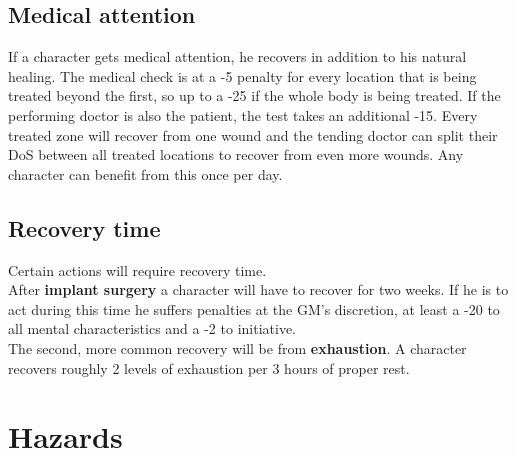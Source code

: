 \documentclass[12pt,a4paper]{book}
\begin{document}
	\section{Medical attention}
	If a character gets medical attention, he recovers in addition to his natural healing. The medical check is at a -5 penalty for every location that is being treated beyond the first, so up to a -25 if the whole body is being treated. If the performing doctor is also the patient, the test takes an additional -15. Every treated zone will recover from one wound and the tending doctor can split their DoS between all treated locations to recover from even more wounds. Any character can benefit from this once per day.
	\section{Recovery time}
	Certain actions will require recovery time.\\
	After \textbf{implant surgery} a character will have to recover for two weeks. If he is to act during this time he suffers penalties at the GM’s discretion, at least a -20 to all mental characteristics and a -2 to initiative.\\
	The second, more common recovery will be from \textbf{exhaustion}. A character recovers roughly 2 levels of exhaustion per 3 hours of proper rest.
	
	\chapter{Hazards}
\end{document}
